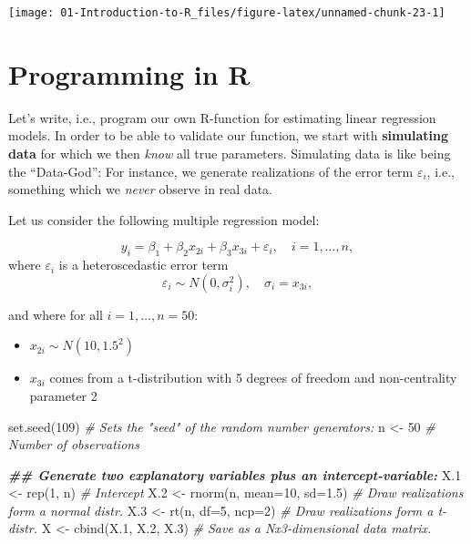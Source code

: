 \documentclass[
]{book}
\newenvironment{Shaded}{\begin{snugshade}}{\end{snugshade}}
\newcommand{\AttributeTok}[1]{\textcolor[rgb]{0.77,0.63,0.00}{#1}}
\newcommand{\CommentTok}[1]{\textcolor[rgb]{0.56,0.35,0.01}{\textit{#1}}}
\newcommand{\DecValTok}[1]{\textcolor[rgb]{0.00,0.00,0.81}{#1}}
\newcommand{\DocumentationTok}[1]{\textcolor[rgb]{0.56,0.35,0.01}{\textbf{\textit{#1}}}}
\newcommand{\FloatTok}[1]{\textcolor[rgb]{0.00,0.00,0.81}{#1}}
\newcommand{\FunctionTok}[1]{\textcolor[rgb]{0.00,0.00,0.00}{#1}}
\newcommand{\NormalTok}[1]{#1}
\newcommand{\OtherTok}[1]{\textcolor[rgb]{0.56,0.35,0.01}{#1}}
\providecommand{\tightlist}{%
  \setlength{\itemsep}{0pt}\setlength{\parskip}{0pt}}
\begin{document}
\begin{center}\texttt{[image: 01-Introduction-to-R\_files/figure-latex/unnamed-chunk-23-1]} \end{center}

\hfill\break

\hypertarget{programming-in-r}{%
\section{Programming in R}\label{programming-in-r}}

Let's write, i.e., program our own R-function for estimating linear regression models. In order to be able to validate our function, we start with \textbf{simulating data} for which we then \emph{know} all true parameters. Simulating data is like being the ``Data-God'': For instance, we generate realizations of the error term \(\varepsilon_i\), i.e., something which we \emph{never} observe in real data.

\hfill\break

Let us consider the following multiple regression model:

\[y_i=\beta_1 +\beta_2 x_{2i}+\beta_3 x_{3i}+\varepsilon_{i},\quad i=1,\dots,n,\]
where \(\varepsilon_{i}\) is a heteroscedastic error term
\[\varepsilon_{i}\sim N(0,\sigma_i^2),\quad \sigma_i=x_{3i},\]

and where for all \(i=1,\dots,n=50\):

\begin{itemize}
\tightlist
\item
  \(x_{2i}\sim N(10,1.5^2)\)
\item
  \(x_{3i}\) comes from a t-distribution with 5 degrees of freedom and non-centrality parameter 2
\end{itemize}

\begin{Shaded}
\begin{Highlighting}[]
\FunctionTok{set.seed}\NormalTok{(}\DecValTok{109}\NormalTok{) }\CommentTok{\# Sets the "seed" of the random number generators:}
\NormalTok{n   }\OtherTok{\textless{}{-}} \DecValTok{50}     \CommentTok{\# Number of observations}

\DocumentationTok{\#\# Generate two explanatory variables plus an intercept{-}variable:}
\NormalTok{X}\FloatTok{.1} \OtherTok{\textless{}{-}} \FunctionTok{rep}\NormalTok{(}\DecValTok{1}\NormalTok{, n)                 }\CommentTok{\# Intercept}
\NormalTok{X}\FloatTok{.2} \OtherTok{\textless{}{-}} \FunctionTok{rnorm}\NormalTok{(n, }\AttributeTok{mean=}\DecValTok{10}\NormalTok{, }\AttributeTok{sd=}\FloatTok{1.5}\NormalTok{) }\CommentTok{\# Draw realizations form a normal distr.}
\NormalTok{X}\FloatTok{.3} \OtherTok{\textless{}{-}} \FunctionTok{rt}\NormalTok{(n, }\AttributeTok{df=}\DecValTok{5}\NormalTok{, }\AttributeTok{ncp=}\DecValTok{2}\NormalTok{)        }\CommentTok{\# Draw realizations form a t{-}distr.}
\NormalTok{X   }\OtherTok{\textless{}{-}} \FunctionTok{cbind}\NormalTok{(X}\FloatTok{.1}\NormalTok{, X}\FloatTok{.2}\NormalTok{, X}\FloatTok{.3}\NormalTok{)      }\CommentTok{\# Save as a Nx3{-}dimensional data matrix.}
\end{Highlighting}
\end{Shaded}
\end{document}
